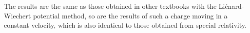 \documentclass[11pt]{article}              %
\begin{document}
The results are the same as those obtained in other textbooks with the Li\'{e}nard-Wiechert potential method, so are the results of such a charge moving in a constant velocity, which is also identical to those obtained from special relativity.













\end{document}
